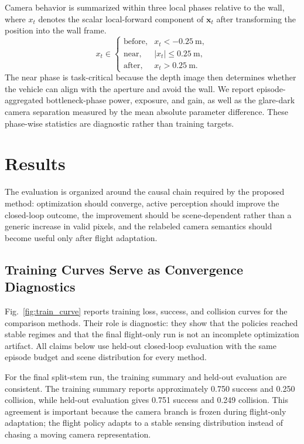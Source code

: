 \documentclass[letterpaper,journal]{IEEEtran}
\begin{document}
Camera behavior is summarized within three local phases relative to the wall,
where $x_t$ denotes the scalar local-forward component of $\mathbf{x}_t$ after
transforming the position into the wall frame.
\begin{equation}
x_t \in
\begin{cases}
\text{before}, & x_t < -0.25~\mathrm{m},\\
\text{near}, & |x_t| \le 0.25~\mathrm{m},\\
\text{after}, & x_t > 0.25~\mathrm{m}.
\end{cases}
\end{equation}
The near phase is task-critical because the depth image then determines whether
the vehicle can align with the aperture and avoid the wall. We report
episode-aggregated bottleneck-phase power, exposure, and gain, as well as the
glare-dark camera separation measured by the mean absolute parameter
difference. These phase-wise statistics are diagnostic rather than training
targets.

\section{Results}
The evaluation is organized around the causal chain required by the proposed
method: optimization should converge, active perception should improve the
closed-loop outcome, the improvement should be scene-dependent rather than a
generic increase in valid pixels, and the relabeled camera semantics should
become useful only after flight adaptation.

\subsection{Training Curves Serve as Convergence Diagnostics}
Fig.~\ref{fig:train_curve} reports training loss, success, and collision
curves for the comparison methods. Their role is diagnostic: they show that
the policies reached stable regimes and that the final flight-only run is not
an incomplete optimization artifact. All claims below use held-out closed-loop
evaluation with the same episode budget and scene distribution for every
method.

For the final split-stem run, the training summary and held-out evaluation are
consistent. The training summary reports approximately 0.750 success and 0.250
collision, while held-out evaluation gives 0.751 success and 0.249 collision.
This agreement is important because the camera branch is frozen during
flight-only adaptation; the flight policy adapts to a stable sensing
distribution instead of chasing a moving camera representation.
\end{document}
